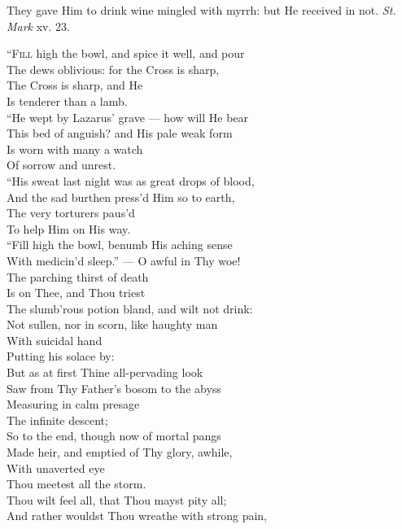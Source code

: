 
They gave Him to drink wine mingled with myrrh: but He received in not. \emph{St. Mark} xv. 23.

“\textsc{Fill} high the bowl, and spice it well, and pour \\
 The dews oblivious: for the Cross is sharp, \\
 The Cross is sharp, and He \\
 Is tenderer than a lamb. \\
  “He wept by Lazarus’ grave — how will He bear \\
 This bed of anguish? and His pale weak form \\
 Is worn with many a watch \\
 Of sorrow and unrest. \\
  “His sweat last night was as great drops of blood, \\
 And the sad burthen press’d Him so to earth, \\
 The very torturers paus’d \\
 To help Him on His way. \\
  “Fill high the bowl, benumb His aching sense \\
 With medicin’d sleep.” — O awful in Thy woe! \\
 The parching thirst of death \\
 Is on Thee, and Thou triest \\
  The slumb’rous potion bland, and wilt not drink: \\
 Not sullen, nor in scorn, like haughty man \\
 With suicidal hand \\
 Putting his solace by: \\
  But as at first Thine all-pervading look \\
 Saw from Thy Father’s bosom to the abyss \\
 Measuring in calm presage \\
 The infinite descent; \\
  So to the end, though now of mortal pangs \\
 Made heir, and emptied of Thy glory, awhile, \\
 With unaverted eye \\
 Thou meetest all the storm. \\
  Thou wilt feel all, that Thou mayst pity all; \\
 And rather wouldst Thou wreathe with strong pain, \\

